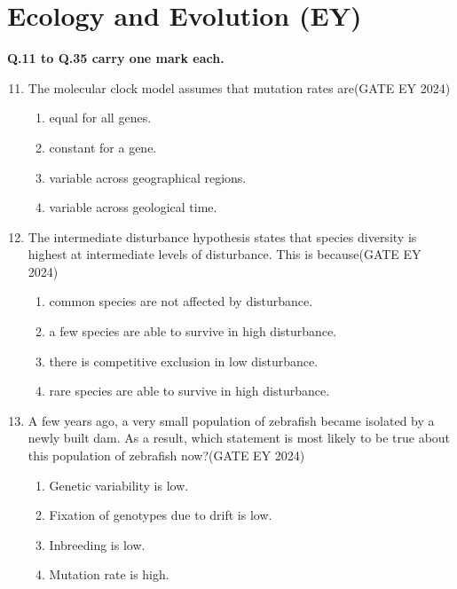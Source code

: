 \section*{\textbf{Ecology and Evolution (EY)}}
\textbf{Q.11 to Q.35 carry one mark each.}
\begin{enumerate}
\setcounter{enumi}{10}

\item The molecular clock model assumes that mutation rates are\hfill{(GATE EY 2024)}
    \begin{multicols}{2}
    \begin{enumerate}
        \item equal for all genes.
        \item constant for a gene.
        \item variable across geographical regions.
        \item variable across geological time.
    \end{enumerate}
    \end{multicols}

\item The intermediate disturbance hypothesis states that species diversity is highest at intermediate levels of disturbance. This is because\hfill{(GATE EY 2024)}
    \begin{enumerate}
        \item common species are not affected by disturbance.
        \item a few species are able to survive in high disturbance.
        \item there is competitive exclusion in low disturbance.
        \item rare species are able to survive in high disturbance.
    \end{enumerate}

\item A few years ago, a very small population of zebrafish became isolated by a newly built dam. As a result, which statement is most likely to be true about this population of zebrafish now?\hfill{(GATE EY 2024)}
    \begin{enumerate}
        \item Genetic variability is low.
        \item Fixation of genotypes due to drift is low.
        \item Inbreeding is low.
        \item Mutation rate is high.
    \end{enumerate}


\end{enumerate}
